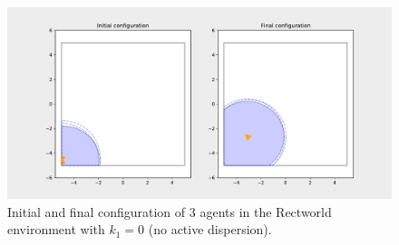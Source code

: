 \begin{figure}[H]
  \centering
  \includegraphics[width=\textwidth]{figs/bigworld_3_agnt_k_1_0_k_2_1_distr.pdf}
  \caption{Initial and final configuration of 3 agents in the Rectworld environment with $k_{1} = 0$ (no active dispersion).}
  \label{fig:3_agnt_bw_k_1_0_k_2_1_distr}
\end{figure}
